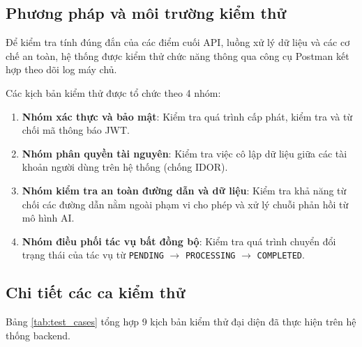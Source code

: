 \documentclass[12pt,a4paper]{report}
\begin{document}
\subsection{Phương pháp và môi trường kiểm thử}
Để kiểm tra tính đúng đắn của các điểm cuối API, luồng xử lý dữ liệu và các cơ chế an toàn, hệ thống được kiểm thử chức năng thông qua công cụ Postman kết hợp theo dõi log máy chủ.

Các kịch bản kiểm thử được tổ chức theo 4 nhóm:
\begin{enumerate}
    \item \textbf{Nhóm xác thực và bảo mật}: Kiểm tra quá trình cấp phát, kiểm tra và từ chối mã thông báo JWT.
    \item \textbf{Nhóm phân quyền tài nguyên}: Kiểm tra việc cô lập dữ liệu giữa các tài khoản người dùng trên hệ thống (chống IDOR).
    \item \textbf{Nhóm kiểm tra an toàn đường dẫn và dữ liệu}: Kiểm tra khả năng từ chối các đường dẫn nằm ngoài phạm vi cho phép và xử lý chuỗi phản hồi từ mô hình AI.
    \item \textbf{Nhóm điều phối tác vụ bất đồng bộ}: Kiểm tra quá trình chuyển đổi trạng thái của tác vụ từ \texttt{PENDING} $\rightarrow$ \texttt{PROCESSING} $\rightarrow$ \texttt{COMPLETED}.
\end{enumerate}

\subsection{Chi tiết các ca kiểm thử}
Bảng \ref{tab:test_cases} tổng hợp 9 kịch bản kiểm thử đại diện đã thực hiện trên hệ thống backend.
\end{document}
